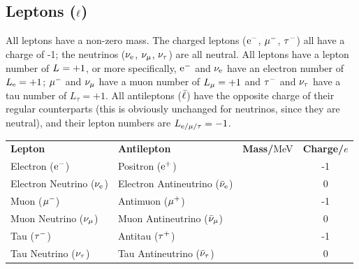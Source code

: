     \subsection{Leptons (\texorpdfstring{$\lepton$}.)}
        All leptons have a non-zero mass.
        The charged leptons ($\electron[-]$, $\muon[-]$, $\taulepton[-]$) all have a charge of -1; the neutrinos ($\neutrino[e]$, $\neutrino[\mu]$, $\neutrino[\tau]$) are all neutral.
        All leptons have a lepton number of $\leptonnumber[]=+1$, or more specifically, $\electron[-]$ and $\neutrino[e]$ have an electron number of $\leptonnumber[e]=+1$; $\muon[-]$ and $\neutrino[\mu]$ have a muon number of $\leptonnumber[\mu]=+1$ and $\taulepton[-]$ and $\neutrino[\tau]$ have a tau number of $L_\tau=+1$.
        All antileptons ($\antilepton$) have the opposite charge of their regular counterparts (this is obviously unchanged for neutrinos, since they are neutral), and their lepton numbers are $\leptonnumber=-1$. \\

        \begin{center}
        \begin{tabular}{l l c c}
            \textbf{Lepton}                    & \textbf{Antilepton}                        & \textbf{Mass/}MeV & \textbf{Charge/}$e$ \\
            Electron ($\electron[-]$)          & Positron ($\electron[+]$)                  &                   & -1                  \\
            Electron Neutrino ($\neutrino[e]$) & Electron Antineutrino ($\antineutrino[e]$) &                   & 0                   \\
            Muon ($\muon[-]$)                  & Antimuon ($\muon[+]$)                      &                   & -1                  \\
            Muon Neutrino ($\neutrino[\mu]$)   & Muon Antineutrino ($\antineutrino[\mu]$)   &                   & 0                   \\
            Tau ($\taulepton[-]$)              & Antitau ($\taulepton[+]$)                  &                   & -1                  \\
            Tau Neutrino ($\neutrino[\tau]$)   & Tau Antineutrino ($\antineutrino[\tau]$)   &                   & 0
        \end{tabular}
        \end{center}

